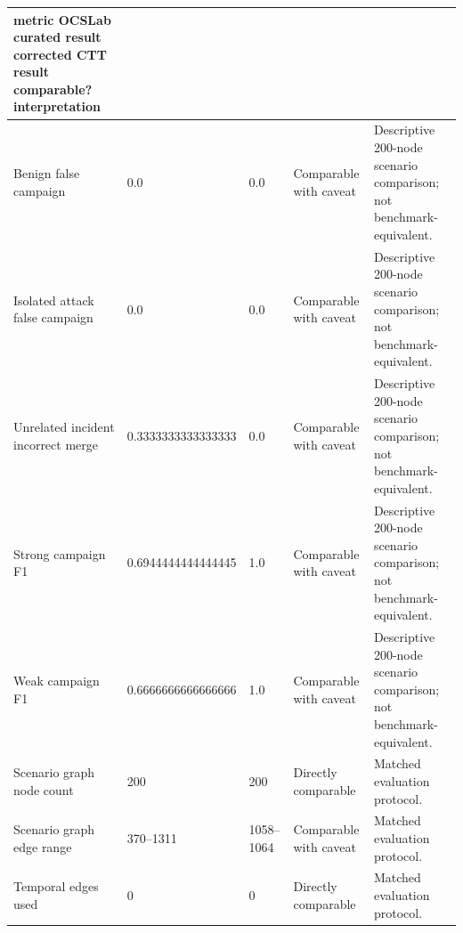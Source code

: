 \begin{tabular}{lllll}
\hline
\textbf{metric} \textbf{OCSLab curated result} \textbf{corrected CTT result} \textbf{comparable?} \textbf{interpretation} \\
\hline
Benign false campaign & 0.0 & 0.0 & Comparable with caveat & Descriptive 200-node scenario comparison; not benchmark-equivalent. \\
Isolated attack false campaign & 0.0 & 0.0 & Comparable with caveat & Descriptive 200-node scenario comparison; not benchmark-equivalent. \\
Unrelated incident incorrect merge & 0.3333333333333333 & 0.0 & Comparable with caveat & Descriptive 200-node scenario comparison; not benchmark-equivalent. \\
Strong campaign F1 & 0.6944444444444445 & 1.0 & Comparable with caveat & Descriptive 200-node scenario comparison; not benchmark-equivalent. \\
Weak campaign F1 & 0.6666666666666666 & 1.0 & Comparable with caveat & Descriptive 200-node scenario comparison; not benchmark-equivalent. \\
Scenario graph node count & 200 & 200 & Directly comparable & Matched evaluation protocol. \\
Scenario graph edge range & 370–1311 & 1058–1064 & Comparable with caveat & Matched evaluation protocol. \\
Temporal edges used & 0 & 0 & Directly comparable & Matched evaluation protocol. \\
\hline
\end{tabular}
